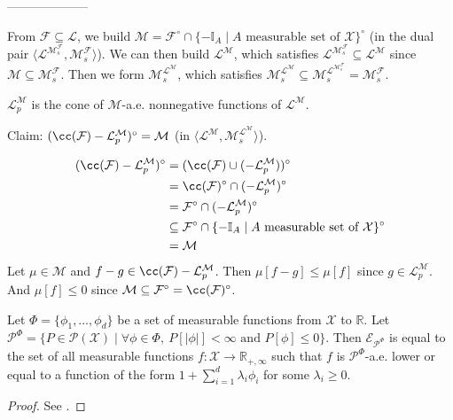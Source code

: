 --------------------

From $\mathcal{F} \subseteq \mathcal{L}$, we build $\mathcal{M} = \mathcal{F}^\circ \cap \{- \mathbb{I}_A \mid A \text{ measurable set of } \mathcal{X}\}^\circ$ (in the dual pair $\langle \mathcal{L}^{\mathcal{M}_s^{\mathcal{F}}}, \mathcal{M}_s^{\mathcal{F}}\rangle$).
We can then build $\mathcal{L}^{\mathcal{M}}$, which satisfies $\mathcal{L}^{\mathcal{M}_s^{\mathcal{F}}} \subseteq \mathcal{L}^{\mathcal{M}}$ since $\mathcal{M} \subseteq \mathcal{M}_s^{\mathcal{F}}$.
Then we form $\mathcal{M}_s^{\mathcal{L}^{\mathcal{M}}}$, which satisfies $\mathcal{M}_s^{\mathcal{L}^{\mathcal{M}}} \subseteq \mathcal{M}_s^{\mathcal{L}^{\mathcal{M}_s^{\mathcal{F}}}} = \mathcal{M}_s^{\mathcal{F}}$.

$\mathcal{L}_p^{\mathcal{M}}$ is the cone of $\mathcal{M}$-a.e. nonnegative functions of $\mathcal{L}^{\mathcal{M}}$.

Claim: $(\cc(\mathcal{F}) - \mathcal{L}_p^{\mathcal{M}})^\circ = \mathcal{M}$ (in $\langle \mathcal{L}^{\mathcal{M}}, \mathcal{M}_s^{\mathcal{L}^{\mathcal{M}}}\rangle$).

\begin{align*}
  (\cc(\mathcal{F}) - \mathcal{L}_p^{\mathcal{M}})^\circ
  &= (\cc(\mathcal{F}) \cup (-\mathcal{L}_p^{\mathcal{M}}))^\circ
  \\
  &= \cc(\mathcal{F})^\circ \cap (-\mathcal{L}_p^{\mathcal{M}})^\circ
  \\
  &= \mathcal{F}^\circ \cap (-\mathcal{L}_p^{\mathcal{M}})^\circ
  \\
  &\subseteq \mathcal{F}^\circ \cap \{- \mathbb{I}_A \mid A \text{ measurable set of } \mathcal{X}\}^\circ
  \\
  &= \mathcal{M}
\end{align*}
Let $\mu \in \mathcal{M}$ and $f - g \in \cc(\mathcal{F}) - \mathcal{L}_p^{\mathcal{M}}$.
Then $\mu[f - g] \le \mu[f]$ since $g \in \mathcal{L}_p^{\mathcal{M}}$. And $\mu[f] \le 0$ since $\mathcal{M} \subseteq \mathcal{F}^\circ = \cc(\mathcal{F})^\circ$.


\begin{theorem}\label{thm:eVar_fin_generated}
Let $\Phi = \{\phi_1, \ldots, \phi_d\}$ be a set of measurable functions from $\mathcal{X}$ to $\mathbb{R}$.
Let $\mathcal{P}^\Phi = \{P \in \mathcal{P}(\mathcal{X}) \mid \forall \phi \in \Phi, \ P[\vert \phi \vert] < \infty \text{ and } P[\phi] \le 0\}$.
Then $\mathcal{E}_{\mathcal{P}^\Phi}$ is equal to the set of all measurable functions $f : \mathcal{X} \to \mathbb{R}_{+, \infty}$ such that $f$ is $\mathcal{P}^{\Phi}$-a.e. lower or equal to a function of the form $1 + \sum_{i=1}^d \lambda_i \phi_i$ for some $\lambda_i \ge 0$.
\end{theorem}

\begin{proof}
See \cite[Theorem 3.1]{larsson2025variables}.
\end{proof}
